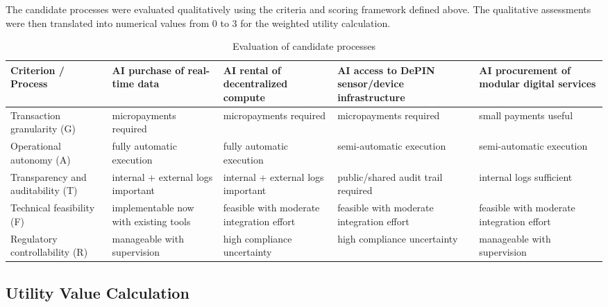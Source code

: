 \documentclass[12pt,a4paper,oneside]{article}
\theoremstyle{definition}
\theoremstyle{plain}
\begin{document}
The candidate processes were evaluated qualitatively using the criteria and scoring framework defined above. The qualitative assessments were then translated into numerical values from 0 to 3 for the weighted utility calculation.

\begin{table}[H]
\centering
\caption{Evaluation of candidate processes}
\label{tab:evaluation_criteria}

\begin{adjustbox}{max width=\textwidth}
\begin{tabular}{p{2.8cm}p{2.4cm}p{2.4cm}p{2.6cm}p{2.4cm}}
\toprule

\textbf{Criterion / Process}
&
\textbf{AI purchase of real-time data}
&
\textbf{AI rental of decentralized compute}
&
\textbf{AI access to DePIN sensor/device infrastructure}
&
\textbf{AI procurement of modular digital services}
\\

\midrule

Transaction granularity (G)
&
micropayments required
&
micropayments required
&
micropayments required
&
small payments useful
\\

Operational autonomy (A)
&
fully automatic execution
&
fully automatic execution
&
semi-automatic execution
&
semi-automatic execution
\\

Transparency and auditability (T)
&
internal + external logs important
&
internal + external logs important
&
public/shared audit trail required
&
internal logs sufficient
\\

Technical feasibility (F)
&
implementable now with existing tools
&
feasible with moderate integration effort
&
feasible with moderate integration effort
&
feasible with moderate integration effort
\\

Regulatory controllability (R)
&
manageable with supervision
&
high compliance uncertainty
&
high compliance uncertainty
&
manageable with supervision
\\

\bottomrule
\end{tabular}
\end{adjustbox}
\end{table}

\subsection{Utility Value Calculation}
\end{document}

